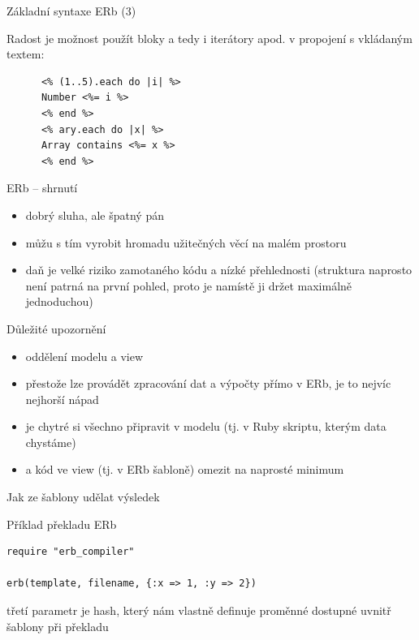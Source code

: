 \documentclass{beamer}
\begin{document}
\begin{frame}[fragile]{Základní syntaxe ERb (3)}
  \begin{block}{ }
    Radost je možnost použít bloky a tedy i iterátory apod. v propojení s vkládaným textem:
    \scriptsize
    \begin{verbatim}
      <% (1..5).each do |i| %>
      Number <%= i %>
      <% end %>
      <% ary.each do |x| %>
      Array contains <%= x %>
      <% end %>
    \end{verbatim}
  \end{block}
\end{frame}

\begin{frame}{ERb -- shrnutí}
  \begin{itemize}
    \item dobrý sluha, ale špatný pán
    \item můžu s tím vyrobit hromadu užitečných věcí na malém prostoru
    \item daň je velké riziko zamotaného kódu a nízké přehlednosti (struktura naprosto není patrná na první pohled, proto je namístě ji držet maximálně jednoduchou)
  \end{itemize}
\end{frame}

\begin{frame}{Důležité upozornění}
  \begin{itemize}
    \item oddělení modelu a view
    \item přestože lze provádět zpracování dat a výpočty přímo v ERb, je to nejvíc nejhorší nápad
    \item je chytré si všechno připravit v modelu (tj. v Ruby skriptu, kterým data chystáme)
    \item a kód ve view (tj. v ERb šabloně) omezit na naprosté minimum
  \end{itemize}
\end{frame}

\begin{frame}[fragile]{Jak ze šablony udělat výsledek}
  \scriptsize
  \begin{block}{Příklad překladu ERb}
    \scriptsize
    \begin{verbatim}
require "erb_compiler"

erb(template, filename, {:x => 1, :y => 2})
    \end{verbatim}
  \end{block}
  třetí parametr je hash, který nám vlastně definuje proměnné dostupné uvnitř šablony při překladu
\end{frame}
\end{document}
